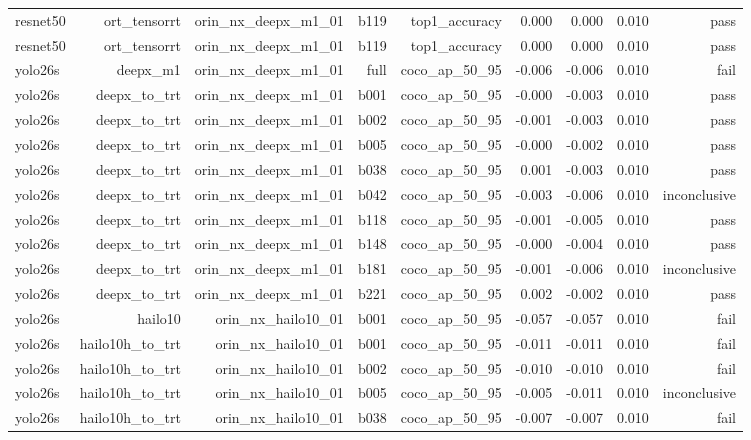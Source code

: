 \begin{table}[t]
\begin{tabular}{lrrrrrrrr}
resnet50 & ort\_tensorrt & orin\_nx\_deepx\_m1\_01 & b119 & top1\_accuracy & 0.000 & 0.000 & 0.010 & pass \\
resnet50 & ort\_tensorrt & orin\_nx\_deepx\_m1\_01 & b119 & top1\_accuracy & 0.000 & 0.000 & 0.010 & pass \\
yolo26s & deepx\_m1 & orin\_nx\_deepx\_m1\_01 & full & coco\_ap\_50\_95 & -0.006 & -0.006 & 0.010 & fail \\
yolo26s & deepx\_to\_trt & orin\_nx\_deepx\_m1\_01 & b001 & coco\_ap\_50\_95 & -0.000 & -0.003 & 0.010 & pass \\
yolo26s & deepx\_to\_trt & orin\_nx\_deepx\_m1\_01 & b002 & coco\_ap\_50\_95 & -0.001 & -0.003 & 0.010 & pass \\
yolo26s & deepx\_to\_trt & orin\_nx\_deepx\_m1\_01 & b005 & coco\_ap\_50\_95 & -0.000 & -0.002 & 0.010 & pass \\
yolo26s & deepx\_to\_trt & orin\_nx\_deepx\_m1\_01 & b038 & coco\_ap\_50\_95 & 0.001 & -0.003 & 0.010 & pass \\
yolo26s & deepx\_to\_trt & orin\_nx\_deepx\_m1\_01 & b042 & coco\_ap\_50\_95 & -0.003 & -0.006 & 0.010 & inconclusive \\
yolo26s & deepx\_to\_trt & orin\_nx\_deepx\_m1\_01 & b118 & coco\_ap\_50\_95 & -0.001 & -0.005 & 0.010 & pass \\
yolo26s & deepx\_to\_trt & orin\_nx\_deepx\_m1\_01 & b148 & coco\_ap\_50\_95 & -0.000 & -0.004 & 0.010 & pass \\
yolo26s & deepx\_to\_trt & orin\_nx\_deepx\_m1\_01 & b181 & coco\_ap\_50\_95 & -0.001 & -0.006 & 0.010 & inconclusive \\
yolo26s & deepx\_to\_trt & orin\_nx\_deepx\_m1\_01 & b221 & coco\_ap\_50\_95 & 0.002 & -0.002 & 0.010 & pass \\
yolo26s & hailo10 & orin\_nx\_hailo10\_01 & b001 & coco\_ap\_50\_95 & -0.057 & -0.057 & 0.010 & fail \\
yolo26s & hailo10h\_to\_trt & orin\_nx\_hailo10\_01 & b001 & coco\_ap\_50\_95 & -0.011 & -0.011 & 0.010 & fail \\
yolo26s & hailo10h\_to\_trt & orin\_nx\_hailo10\_01 & b002 & coco\_ap\_50\_95 & -0.010 & -0.010 & 0.010 & fail \\
yolo26s & hailo10h\_to\_trt & orin\_nx\_hailo10\_01 & b005 & coco\_ap\_50\_95 & -0.005 & -0.011 & 0.010 & inconclusive \\
yolo26s & hailo10h\_to\_trt & orin\_nx\_hailo10\_01 & b038 & coco\_ap\_50\_95 & -0.007 & -0.007 & 0.010 & fail \\

\end{tabular}
\end{table}
